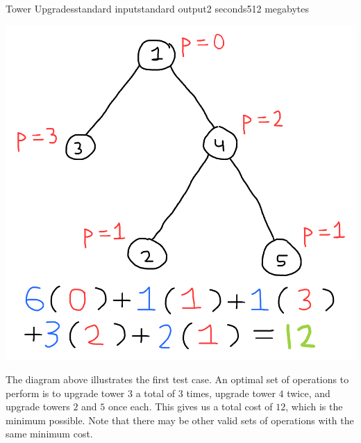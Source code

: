 \begin{problem}{Tower Upgrades}{standard input}{standard output}{2 seconds}{512 megabytes}
\Note
\begin{center}
\includegraphics[scale=0.5]{Drawing-5.sketchpad.png}
\end{center}

The diagram above illustrates the first test case. An optimal set of operations to perform is to upgrade tower $3$ a total of $3$ times, upgrade tower $4$ twice, and upgrade towers $2$ and $5$ once each. This gives us a total cost of $12$, which is the minimum possible. Note that there may be other valid sets of operations with the same minimum cost.

\end{problem}

